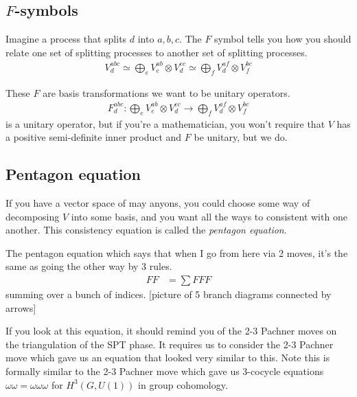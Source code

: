 \subsection{$F$-symbols}
Imagine a process that splits $d$ into $a,b,c$.
The $F$ symbol tells you how you should relate one set of splitting processes
to another set of splitting processes.
\begin{align}
    V_d^{abc}
    \simeq
    \bigoplus_e
    V_e^{ab}
    \otimes
    V_d^{ec}
    \simeq
    \bigoplus_f V_d^{af}\otimes V_f^{bc}
\end{align}

These $F$ are basis transformations we want to be unitary operators.
\begin{align}
    F_{d}^{abc}:
    \bigoplus_e V_e^{ab}
    \otimes
    V_d^{ec}
    \to
    \bigoplus_{f}
    V_d^{af}
    \otimes V_f^{bc}
\end{align}
is a unitary operator,
but if you're a mathematician,
you won't require that $V$ has a positive semi-definite inner product and $F$ be
unitary,
but we do.

\subsection{Pentagon equation}
If you have a vector space of may anyons,
you could choose some way of decomposing $V$ into some basis,
and you want all the ways to consistent with one another.
This consistency equation is called the \emph{pentagon equation}.

The pentagon equation which says that when I go from here via 2 moves,
it's the same as going the other way by 3 rules.
\begin{align}
    FF &= \sum FFF
\end{align}
summing over a bunch of indices.
[picture of 5 branch diagrams connected by arrows]

If you look at this equation,
it should remind you of the 2-3 Pachner moves on the triangulation of the SPT
phase.
It requires us to consider the 2-3 Pachner move which gave us an equation that
looked very similar to this.
Note this is formally similar to the 2-3 Pachner move which gave us 3-cocycle
equations
$\omega \omega = \omega \omega \omega$
for $H^3\left( G, U(1) \right)$ in group cohomology.

